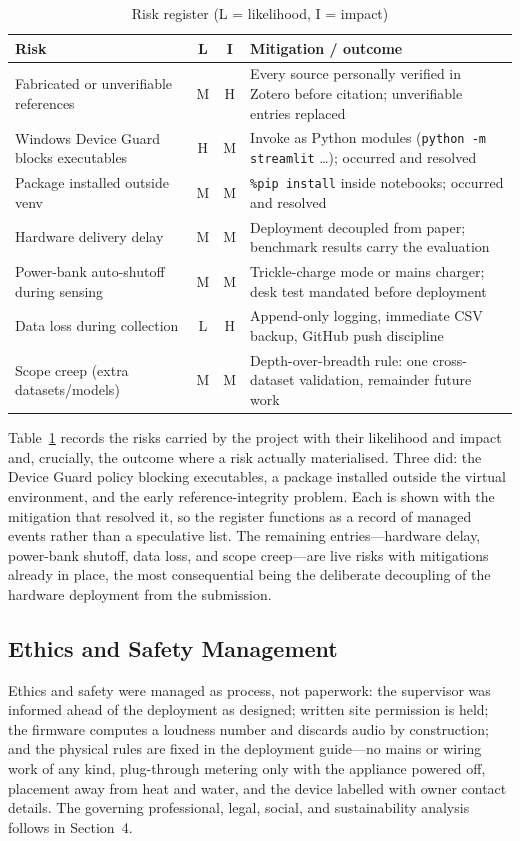 \documentclass[11pt,a4paper]{article}
\begin{document}
\begin{table}[htbp]
\centering
\caption{Risk register (L = likelihood, I = impact)}
\label{tab:risk}
\small
\renewcommand{\arraystretch}{1.3}
\begin{tabular}{|p{5.4cm}|c|c|p{6.6cm}|}
\hline
\textbf{Risk} & \textbf{L} & \textbf{I} & \textbf{Mitigation / outcome}\\ \hline
Fabricated or unverifiable references & M & H & Every source personally verified in Zotero before citation; unverifiable entries replaced\\ \hline
Windows Device Guard blocks executables & H & M & Invoke as Python modules (\texttt{python -m streamlit} \dots); occurred and resolved\\ \hline
Package installed outside venv & M & M & \texttt{\%pip install} inside notebooks; occurred and resolved\\ \hline
Hardware delivery delay & M & M & Deployment decoupled from paper; benchmark results carry the evaluation\\ \hline
Power-bank auto-shutoff during sensing & M & M & Trickle-charge mode or mains charger; desk test mandated before deployment\\ \hline
Data loss during collection & L & H & Append-only logging, immediate CSV backup, GitHub push discipline\\ \hline
Scope creep (extra datasets/models) & M & M & Depth-over-breadth rule: one cross-dataset validation, remainder future work\\ \hline
\end{tabular}
\end{table}

Table~\ref{tab:risk} records the risks carried by the project with their likelihood and impact and, crucially, the outcome where a risk actually materialised. Three did: the Device Guard policy blocking executables, a package installed outside the virtual environment, and the early reference-integrity problem. Each is shown with the mitigation that resolved it, so the register functions as a record of managed events rather than a speculative list. The remaining entries---hardware delay, power-bank shutoff, data loss, and scope creep---are live risks with mitigations already in place, the most consequential being the deliberate decoupling of the hardware deployment from the submission.



\subsection{Ethics and Safety Management}
Ethics and safety were managed as process, not paperwork: the supervisor was
informed ahead of the deployment as designed; written site permission is held; the
firmware computes a loudness number and discards audio by construction; and the
physical rules are fixed in the deployment guide---no mains or wiring work of
any kind, plug-through metering only with the appliance powered off, placement
away from heat and water, and the device labelled with owner contact details.
The governing professional, legal, social, and sustainability analysis follows
in Section~4.
\end{document}

